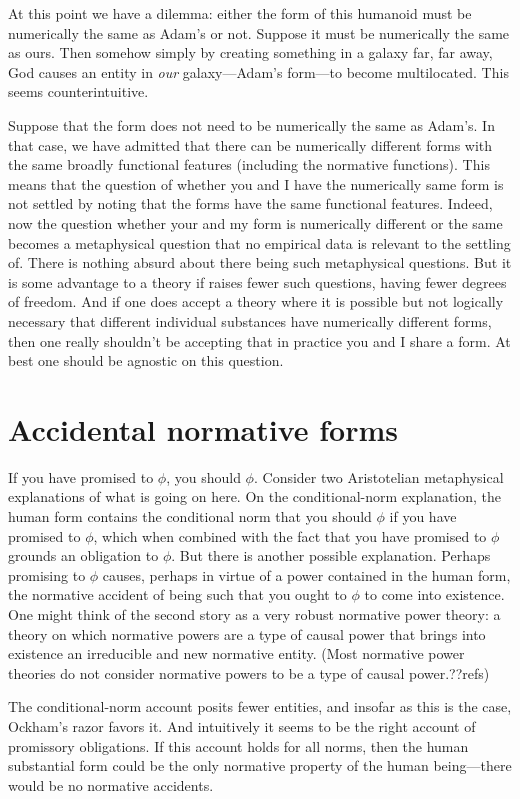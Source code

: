 At this point we have a dilemma: either the form of this humanoid must be numerically the same as Adam's or not. Suppose it 
must be numerically the same as ours. Then somehow simply by creating something in a galaxy far, far away, God causes an
entity in \textit{our} galaxy---Adam's form---to become multilocated. This seems counterintuitive. 

Suppose that the form does not need to be numerically the same as Adam's. In that case, we have admitted that there can 
be numerically different forms with the same broadly functional features (including the normative functions). This 
means that the question of whether you and I have the  numerically same form is not settled by noting that the forms have 
the same functional features. Indeed, now the question whether your and my form is numerically different or the same becomes
a metaphysical question that no empirical data is relevant to the settling of. There is nothing absurd about there being
such metaphysical questions. But it is some advantage to a theory if raises fewer such questions, having fewer degrees of 
freedom. And if one does accept a theory where it is possible but not logically necessary that different individual substances
have numerically different forms, then one really shouldn't be accepting that in practice you and I share a form. At best
one should be agnostic on this question.

\section{Accidental normative forms}
If you have promised to $\phi$, you should $\phi$. Consider two Aristotelian metaphysical explanations of what is going on here.
On the conditional-norm explanation, the human form contains the conditional norm that you should $\phi$ if you have promised 
to $\phi$, which when combined with the fact that you have promised to $\phi$ grounds an obligation to $\phi$. But there is
another possible explanation. Perhaps promising to $\phi$ causes, perhaps in virtue of a power contained in the human form, 
the normative accident of being such that you ought to $\phi$ to come into existence. One might think of the second story as 
a very robust normative power theory: a theory on which normative powers are a type of causal power that brings into existence
an irreducible and new normative entity. (Most normative power theories do not consider normative powers to be a type of 
causal power.??refs) 

The conditional-norm account posits fewer entities, and insofar as this is the case, Ockham's razor favors it. And intuitively
it seems to be the right account of promissory obligations. If this account holds for all norms, then the human substantial form could be 
the only normative property of the human being---there would be no normative accidents.

